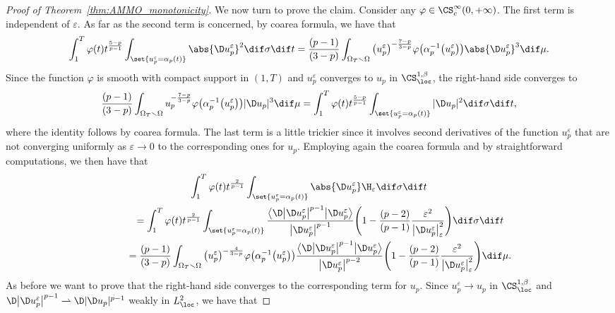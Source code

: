 \begin{proof}[Proof of Theorem~\ref{thm:AMMO_monotonicity}]
We now turn to prove the claim. Consider any $\varphi \in \CS^\infty_c(0,+\infty)$. The first term is independent of $\varepsilon$. As far as the second term is concerned, by coarea formula, we have that
\[
 \int_1^T\varphi(t)t^{\frac{5-p}{p-1}} \int_{\set{u_p^\varepsilon=\alpha_p(t)}} \abs{\D u^\varepsilon_p}^2 \dif \sigma \dif t = \frac{(p-1)}{(3-p)} \int_{\Omega_T \smallsetminus \Omega} \big(u^\varepsilon_p\big)^{-\frac{7-p}{3-p}}\varphi \big(\alpha_p^{-1}\big(u^\varepsilon_p\big)\big) \abs{ \D u_p^\varepsilon}^3 \dif \mu.
\]
Since the function $\varphi$ is smooth with compact support in $(1,T)$ and $u_p^\varepsilon$ converges to $u_p$ in $\CS^{1,\beta}_{\loc}$, the right-hand side converges to
\[
 \frac{(p-1)}{(3-p)} \int_{\Omega_T \smallsetminus \Omega} u_p^{-\frac{7-p}{3-p}}\varphi \big(\alpha_p^{-1}\big(u^\varepsilon_p\big)\big)| \D u_p |^3 \dif \mu = \int_1^T \varphi(t)t^{\frac{5-p}{p-1}} \int_{\set{u_p^\varepsilon=\alpha_p(t)}} |\D u_p |^2 \dif \sigma \dif t,
\]
where the identity follows by coarea formula. The last term is a little trickier since it involves second derivatives of the function $u_p^\varepsilon$ that are not converging uniformly as $\varepsilon \to 0$ to the corresponding ones for $u_p$. Employing again the coarea formula and by straightforward computations, we then have that
\begin{gather*}
 \int_1^T\varphi(t)t^{\frac{2}{p-1}} \int_{\set{u_p^\varepsilon=\alpha_p(t)}} \abs{\D u^\varepsilon_p} \H_\varepsilon\dif \sigma \dif t \\
 \qquad {}=
 \int_1^T\varphi(t)t^{\frac{2}{p-1}} \int_{\set{u_p^\varepsilon=\alpha_p(t)}} \frac{\big\langle \D \big| \D u^\varepsilon_p\big|^{p-1}\big|\D u^\varepsilon_p\big\rangle}{\big| \D u_p^\varepsilon\big|^{p-1} }\Bigg( 1 - \frac{(p-2)}{(p-1)} \frac{ \varepsilon^2}{\big|\D u^\varepsilon_p\big|_\varepsilon^2}\Bigg)\dif \sigma \dif t\\
 \qquad {}=\frac{(p-1)}{(3-p)} \int_{\Omega_T \smallsetminus \Omega} \big(u^\varepsilon_p\big)^{-\frac{4}{3-p}}\varphi \big(\alpha_p^{-1}\big(u^\varepsilon_p\big)\big)\frac{\big\langle\D \big| \D u^\varepsilon_p\big|^{p-1}\big|\D u^\varepsilon_p\big\rangle}{\big| \D u_p^\varepsilon\big|^{p-2} }\Bigg( 1 - \frac{(p-2)}{(p-1)} \frac{ \varepsilon^2}{\big|\D u^\varepsilon_p\big|_\varepsilon^2}\Bigg) \dif \mu.
\end{gather*}
As before we want to prove that the right-hand side converges to the corresponding term for $u_p$. Since $u^\varepsilon_p\to u_p$ in $\CS^{1, \beta}_{\loc}$ and $\D\big| \D u^\varepsilon_p\big|^{p-1}\rightharpoonup \D| \D u_p |^{p-1} $ weakly in $L^2_{\loc}$, we have that

\end{proof}
